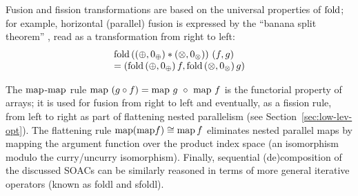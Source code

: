 Fusion and fission transformations are based on the universal
properties of $\mathrm{fold}$; for example, horizontal (parallel) fusion is
expressed by the ``banana split theorem'' \cite{mfp91}, read as a
transformation from right to left:
\[
   \begin{array}{l}
  \mathrm{fold}\, ((\oplus, 0_{\oplus}) * (\otimes, 0_{\otimes})) ~ (f, g) \\=(\mathrm{fold}\, (\oplus, 0_{\oplus})\, f, \mathrm{fold}\, (\otimes,
     0_{\otimes})\, g )
   \end{array}
\]

The $\mathrm{map}$-$\mathrm{map}$ rule $\mathrm{map} ~ (g \circ f) = \mathrm{map} ~ g ~ \circ ~ \mathrm{map} ~ f$
is the functorial property of arrays; it is used for fusion from right
to left and eventually, as a fission rule, from left to right as part
of flattening nested parallelism (see Section~\ref{sec:low-lev-opt}).
%
The flattening rule
$ \mathrm{map} (\mathrm{map} f) \cong \mathrm{map} \,f$
eliminates nested parallel maps by mapping the argument function over
the product index space (an isomorphism modulo the
curry/uncurry isomorphism).
Finally, sequential (de)composition of the discussed SOACs
can be similarly reasoned in terms of more general iterative operators
(known as foldl and sfoldl).


